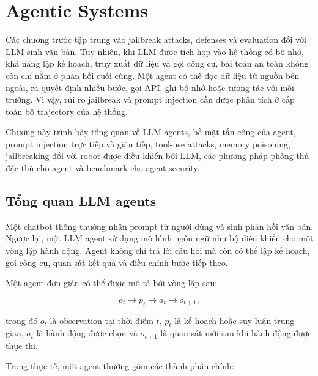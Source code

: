 \section{Agentic Systems}
\label{sec:agentic-systems}

Các chương trước tập trung vào jailbreak attacks, defenses và evaluation
đối với LLM sinh văn bản. Tuy nhiên, khi LLM được tích hợp vào hệ thống có
bộ nhớ, khả năng lập kế hoạch, truy xuất dữ liệu và gọi công cụ, bài toán
an toàn không còn chỉ nằm ở phản hồi cuối cùng. Một agent có thể đọc dữ
liệu từ nguồn bên ngoài, ra quyết định nhiều bước, gọi API, ghi bộ nhớ hoặc
tương tác với môi trường. Vì vậy, rủi ro jailbreak và prompt injection cần
được phân tích ở cấp toàn bộ trajectory của hệ thống.

Chương này trình bày tổng quan về LLM agents, bề mặt tấn công của agent,
prompt injection trực tiếp và gián tiếp, tool-use attacks, memory poisoning,
jailbreaking đối với robot được điều khiển bởi LLM, các phương pháp phòng
thủ đặc thù cho agent và benchmark cho agent security.

\subsection{Tổng quan LLM agents}
\label{subsec:llm-agents-overview}

Một chatbot thông thường nhận prompt từ người dùng và sinh phản hồi văn
bản. Ngược lại, một LLM agent sử dụng mô hình ngôn ngữ như bộ điều khiển
cho một vòng lặp hành động. Agent không chỉ trả lời câu hỏi mà còn có thể
lập kế hoạch, gọi công cụ, quan sát kết quả và điều chỉnh bước tiếp theo.

Một agent đơn giản có thể được mô tả bởi vòng lặp sau:

\begin{equation}
    o_t \rightarrow p_t \rightarrow a_t \rightarrow o_{t+1},
    \label{eq:agent-loop}
\end{equation}

trong đó $o_t$ là observation tại thời điểm $t$, $p_t$ là kế hoạch hoặc
suy luận trung gian, $a_t$ là hành động được chọn và $o_{t+1}$ là quan sát
mới sau khi hành động được thực thi.

Trong thực tế, một agent thường gồm các thành phần chính:

